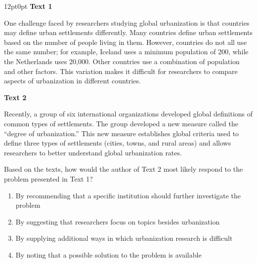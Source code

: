 \documentclass[11pt, twocolumn]{article}
\newcounter{questionnum}
\begin{document}
\vspace{6pt}\noindent
\begin{minipage}{\columnwidth}\raggedright
\noindent{}\par\vspace{8pt}
\begin{adjustwidth}{12pt}{0pt}
\textbf{Text 1}

One challenge faced by researchers studying global urbanization is that countries may define urban settlements differently. Many countries define urban settlements based on the number of people living in them. However, countries do not all use the same number; for example, Iceland uses a minimum population of 200, while the Netherlands uses 20,000. Other countries use a combination of population and other factors. This variation makes it difficult for researchers to compare aspects of urbanization in different countries.

 

\vspace{8pt}
\textbf{Text 2}

Recently, a group of six international organizations developed global definitions of common types of settlements. The group developed a new measure called the ``degree of urbanization.'' This new measure establishes global criteria used to define three types of settlements (cities, towns, and rural areas) and allows researchers to better understand global urbanization rates.
\vspace{6pt}

Based on the texts, how would the author of Text 2 most likely respond to the problem presented in Text 1?
\begin{enumerate}[label=\Alph*),leftmargin=18pt,topsep=3pt,itemsep=2pt]
  \item By recommending that a specific institution should further investigate the problem
  \item By suggesting that researchers focus on topics besides urbanization
  \item By supplying additional ways in which urbanization research is difficult
  \item By noting that a possible solution to the problem is available
\end{enumerate}
\end{adjustwidth}
\end{minipage}\par
\end{document}
